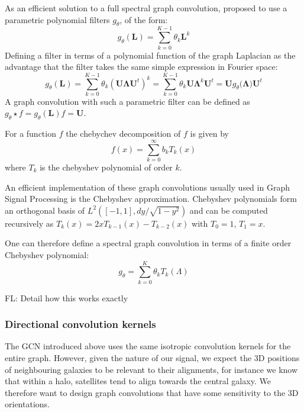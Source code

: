 \documentclass[a4paper,fleqn,usenatbib]{mnras}
\newcommand{\fl}[1]{{\color{magenta}FL: #1}}
\begin{document}
As an efficient solution to a  full spectral graph  convolution, \cite{Defferrard2016} proposed to use a parametric polynomial filters $g_\theta$, of the form:
\begin{equation}
	g_\theta(\mathbf{L}) = \sum_{k=0}^{K-1} \theta_k \mathbf{L}^k
\end{equation}
Defining a filter in  terms of a polynomial function of the graph Laplacian as the advantage that the filter takes the same simple expression in Fourier space: 
\begin{equation}
	g_\theta(\mathbf{L}) =  \sum_{k=0}^{K-1} \theta_k (\mathbf{U} \mathbf{\Lambda}  \mathbf{U}^t)^k  = \sum_{k=0}^{K-1} \theta_k \mathbf{U} \mathbf{\Lambda}^k \mathbf{U}^t =  \mathbf{U}  g_\theta(\mathbf{\Lambda)} \mathbf{U}^t 
\end{equation}
A graph convolution with such a parametric filter can be defined as $g_\theta \star f = g_\theta(\mathbf{L}) f = \mathbf{U} $.

For a function $f$ the chebychev decomposition of $f$ is given by 
\begin{equation}
	f(x) = \sum\limits_{k=0}^{\infty} b_{k} T_k(x)
\end{equation}
where $T_k$ is the  chebyshev polynomial of order $k$.

An efficient implementation of these graph convolutions usually used in Graph Signal Processing is the Chebyshev approximation. Chebyshev polynomials form an orthogonal basis of $L^2([-1,1], dy/\sqrt{1 - y^2})$ and can be computed recursively as $T_k(x) = 2x T_{k-1}(x) - T_{k-2}(x)$ with $T_0 =1$, $T_1 = x$.  

One can therefore define a spectral graph convolution in terms of a finite order Chebyshev polynomial:
\begin{equation}
	g_\theta = \sum_{k=0}^K \theta_k T_k(\Lambda)
\end{equation}

\fl{Detail how this works exactly}

\subsubsection{Directional convolution kernels}

The GCN introduced above uses the same isotropic convolution kernels for the entire graph. However, given the  nature of our signal, we expect the 3D positions of neighbouring galaxies to be relevant to their alignments, for instance we know that within a halo, satellites tend to align towards the central galaxy. We therefore want to design graph convolutions that have some sensitivity to the 3D orientations. 
\end{document}
